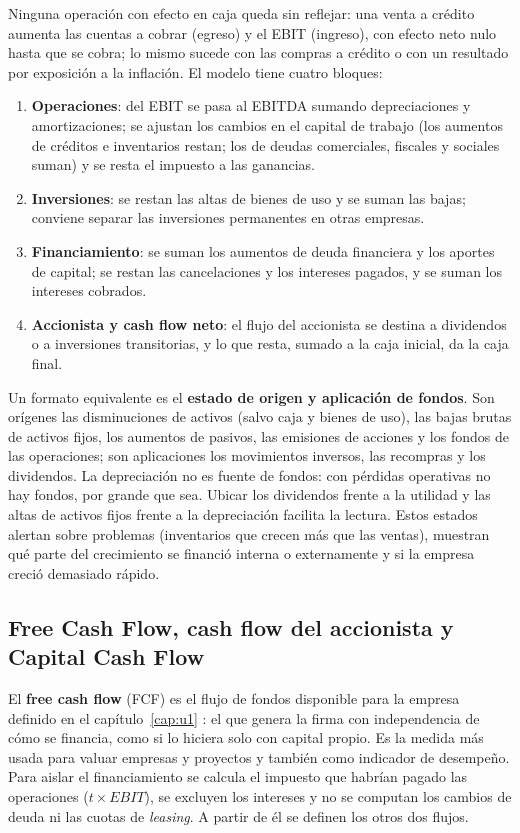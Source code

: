 Ninguna operación con efecto en caja queda sin reflejar: una venta a crédito aumenta las cuentas a cobrar (egreso) y el EBIT (ingreso), con efecto neto nulo hasta que se cobra; lo mismo sucede con las compras a crédito o con un resultado por exposición a la inflación. El modelo tiene cuatro bloques:
\begin{enumerate}
\item \textbf{Operaciones}: del EBIT se pasa al EBITDA sumando depreciaciones y amortizaciones; se ajustan los cambios en el capital de trabajo (los aumentos de créditos e inventarios restan; los de deudas comerciales, fiscales y sociales suman) y se resta el impuesto a las ganancias.
\item \textbf{Inversiones}: se restan las altas de bienes de uso y se suman las bajas; conviene separar las inversiones permanentes en otras empresas.
\item \textbf{Financiamiento}: se suman los aumentos de deuda financiera y los aportes de capital; se restan las cancelaciones y los intereses pagados, y se suman los intereses cobrados.
\item \textbf{Accionista y cash flow neto}: el flujo del accionista se destina a dividendos o a inversiones transitorias, y lo que resta, sumado a la caja inicial, da la caja final.
\end{enumerate}

Un formato equivalente es el \textbf{estado de origen y aplicación de fondos}. Son orígenes las disminuciones de activos (salvo caja y bienes de uso), las bajas brutas de activos fijos, los aumentos de pasivos, las emisiones de acciones y los fondos de las operaciones; son aplicaciones los movimientos inversos, las recompras y los dividendos. La depreciación no es fuente de fondos: con pérdidas operativas no hay fondos, por grande que sea. Ubicar los dividendos frente a la utilidad y las altas de activos fijos frente a la depreciación facilita la lectura. Estos estados alertan sobre problemas (inventarios que crecen más que las ventas), muestran qué parte del crecimiento se financió interna o externamente y si la empresa creció demasiado rápido.

\subsection{Free Cash Flow, cash flow del accionista y Capital Cash Flow}\label{sec:u2-flujos}

El \textbf{free cash flow} (FCF) es el flujo de fondos disponible para la empresa definido en el capítulo~\ref{cap:u1} : el que genera la firma con independencia de cómo se financia, como si lo hiciera solo con capital propio. Es la medida más usada para valuar empresas y proyectos y también como indicador de desempeño. Para aislar el financiamiento se calcula el impuesto que habrían pagado las operaciones ($t\times EBIT$), se excluyen los intereses y no se computan los cambios de deuda ni las cuotas de \emph{leasing}. A partir de él se definen los otros dos flujos.


